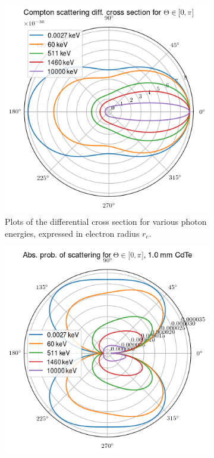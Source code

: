 \documentclass[a4paper,12pt,titlepage, twoside]{article}
\begin{document}
\begin{figure}[ht]
  \centering
  \begin{subfigure}{0.30\textwidth}
    \includegraphics[width=1.0\textwidth]{./fig/klein_nishina_1.png}
    \caption{Plots of the differential cross section for various photon energies, expressed in electron radius $r_e$.}
    \label{fig:klein_1}
  \end{subfigure}
  \begin{subfigure}{0.30\textwidth}
    \includegraphics[width=1.0\textwidth]{./fig/klein_nishina_2.png}

\end{subfigure}
\end{figure}
\end{document}
